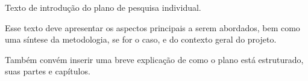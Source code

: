 
Texto de introdução do plano de pesquisa individual.

Esse texto deve apresentar os aspectos principais a serem abordados, bem como uma síntese da metodologia, se for o caso, e do contexto geral do projeto.

Também convém inserir uma breve explicação de como o plano está estruturado, suas partes e capítulos.
